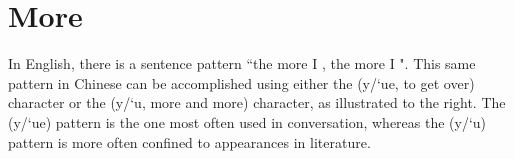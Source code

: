 \section{More}
\begin{minipage}{\tw-81mm}%
In English, there is a sentence pattern ``the more I \blank, the more I \blank".
This same pattern in Chinese can be accomplished using either
the  (y/`ue, to get over) character or
the  (y/`u, more and more) character, as illustrated to the right.
The  (y/`ue) pattern is the one most often used in conversation, whereas
the  (y/`u)  pattern is more often confined to appearances in literature.
\end{minipage}\hfill%

